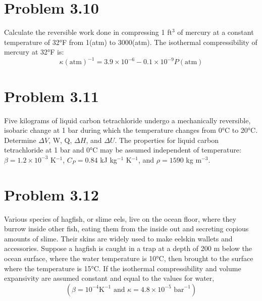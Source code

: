 \documentclass{article}
\begin{document}
\section*{Problem 3.10}
Calculate the reversible work done in compressing 1 ft$^3$ of mercury at a constant temperature of 32°F from 1(atm) to 3000(atm). The isothermal compressibility of mercury at 32°F is:
$$ \kappa(\text{atm})^{-1} = 3.9 \times 10^{-6} - 0.1 \times 10^{-9} P(\text{atm}) $$

\section*{Problem 3.11}
Five kilograms of liquid carbon tetrachloride undergo a mechanically reversible, isobaric change at 1 bar during which the temperature changes from 0°C to 20°C. Determine $\Delta V$, W, Q, $\Delta H$, and $\Delta U$. The properties for liquid carbon tetrachloride at 1 bar and 0°C may be assumed independent of temperature: $\beta = 1.2 \times 10^{-3}$ K$^{-1}$, $C_P = 0.84$ kJ kg$^{-1}$ K$^{-1}$, and $\rho = 1590$ kg m$^{-3}$.

\section*{Problem 3.12}
Various species of hagfish, or slime eels, live on the ocean floor, where they burrow inside other fish, eating them from the inside out and secreting copious amounts of slime. Their skins are widely used to make eelskin wallets and accessories. Suppose a hagfish is caught in a trap at a depth of 200 m below the ocean surface, where the water temperature is 10°C, then brought to the surface where the temperature is 15°C. If the isothermal compressibility and volume expansivity are assumed constant and equal to the values for water,
$$ (\beta = 10^{-4} \text{K}^{-1} \text{ and } \kappa = 4.8 \times 10^{-5} \text{ bar}^{-1}) $$
\end{document}
